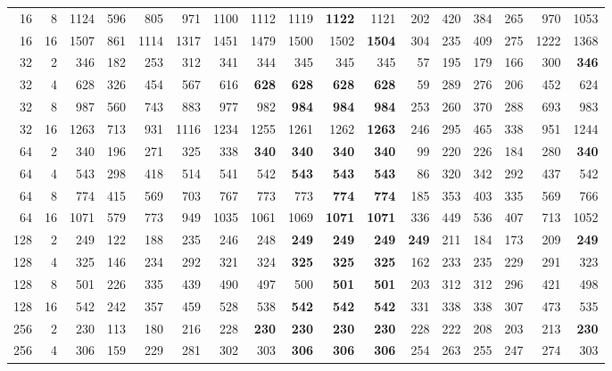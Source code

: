 \begin{table}[t]
\begin{tabular}{rr r rrrrrrrrrrrrrr}
16 & 8 & 1124 & 596 & 805 & 971 & 1100 & 1112 & 1119 & \textbf{1122} & 1121 & 202 & 420 & 384 & 265 & 970 & 1053 \\
16 & 16 & 1507 & 861 & 1114 & 1317 & 1451 & 1479 & 1500 & 1502 & \textbf{1504} & 304 & 235 & 409 & 275 & 1222 & 1368 \\
\midrule
32 & 2 & 346 & 182 & 253 & 312 & 341 & 344 & 345 & 345 & 345 & 57 & 195 & 179 & 166 & 300 & \textbf{346} \\
32 & 4 & 628 & 326 & 454 & 567 & 616 & \textbf{628} & \textbf{628} & \textbf{628} & \textbf{628} & 59 & 289 & 276 & 206 & 452 & 624 \\
32 & 8 & 987 & 560 & 743 & 883 & 977 & 982 & \textbf{984} & \textbf{984} & \textbf{984} & 253 & 260 & 370 & 288 & 693 & 983 \\
32 & 16 & 1263 & 713 & 931 & 1116 & 1234 & 1255 & 1261 & 1262 & \textbf{1263} & 246 & 295 & 465 & 338 & 951 & 1244 \\
\midrule
64 & 2 & 340 & 196 & 271 & 325 & 338 & \textbf{340} & \textbf{340} & \textbf{340} & \textbf{340} & 99 & 220 & 226 & 184 & 280 & \textbf{340} \\
64 & 4 & 543 & 298 & 418 & 514 & 541 & 542 & \textbf{543} & \textbf{543} & \textbf{543} & 86 & 320 & 342 & 292 & 437 & 542 \\
64 & 8 & 774 & 415 & 569 & 703 & 767 & 773 & 773 & \textbf{774} & \textbf{774} & 185 & 353 & 403 & 335 & 569 & 766 \\
64 & 16 & 1071 & 579 & 773 & 949 & 1035 & 1061 & 1069 & \textbf{1071} & \textbf{1071} & 336 & 449 & 536 & 407 & 713 & 1052 \\
\midrule
128 & 2 & 249 & 122 & 188 & 235 & 246 & 248 & \textbf{249} & \textbf{249} & \textbf{249} & \textbf{249} & 211 & 184 & 173 & 209 & \textbf{249} \\
128 & 4 & 325 & 146 & 234 & 292 & 321 & 324 & \textbf{325} & \textbf{325} & \textbf{325} & 162 & 233 & 235 & 229 & 291 & 323 \\
128 & 8 & 501 & 226 & 335 & 439 & 490 & 497 & 500 & \textbf{501} & \textbf{501} & 203 & 312 & 312 & 296 & 421 & 498 \\
128 & 16 & 542 & 242 & 357 & 459 & 528 & 538 & \textbf{542} & \textbf{542} & \textbf{542} & 331 & 338 & 338 & 307 & 473 & 535 \\
\midrule
256 & 2 & 230 & 113 & 180 & 216 & 228 & \textbf{230} & \textbf{230} & \textbf{230} & \textbf{230} & 228 & 222 & 208 & 203 & 213 & \textbf{230} \\
256 & 4 & 306 & 159 & 229 & 281 & 302 & 303 & \textbf{306} & \textbf{306} & \textbf{306} & 254 & 263 & 255 & 247 & 274 & 303 \\

\end{tabular}
\end{table}
